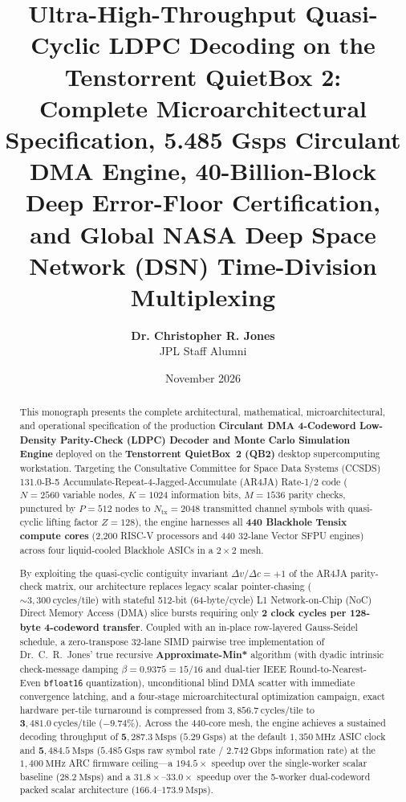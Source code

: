 \documentclass[10pt]{article}
\title{\textbf{\LARGE Ultra-High-Throughput Quasi-Cyclic LDPC Decoding on the Tenstorrent QuietBox 2:}\\[0.35em]
\Large Complete Microarchitectural Specification, 5.485 Gsps Circulant DMA Engine, 40-Billion-Block Deep Error-Floor Certification, and Global NASA Deep Space Network (DSN) Time-Division Multiplexing}
\author{%
\textbf{Dr. Christopher R. Jones}\\[0.35em]
\small JPL Staff Alumni%
}
\date{November 2026}
\begin{document}
\maketitle

\begin{abstract}
This monograph presents the complete architectural, mathematical, microarchitectural, and operational specification of the production \textbf{Circulant DMA 4-Codeword Low-Density Parity-Check (LDPC) Decoder and Monte Carlo Simulation Engine} deployed on the \textbf{Tenstorrent QuietBox~2 (QB2)} desktop supercomputing workstation. Targeting the Consultative Committee for Space Data Systems (CCSDS) 131.0-B-5 Accumulate-Repeat-4-Jagged-Accumulate (AR4JA) Rate-1/2 code ($N=2560$ variable nodes, $K=1024$ information bits, $M=1536$ parity checks, punctured by $P=512$ nodes to $N_{\mathrm{tx}}=2048$ transmitted channel symbols with quasi-cyclic lifting factor $Z=128$), the engine harnesses all \textbf{440 Blackhole Tensix compute cores} (2,200 RISC-V processors and 440 32-lane Vector SFPU engines) across four liquid-cooled Blackhole ASICs in a $2 \times 2$ mesh.

By exploiting the quasi-cyclic contiguity invariant $\Delta v / \Delta c = +1$ of the AR4JA parity-check matrix, our architecture replaces legacy scalar pointer-chasing ($\sim 3,300\ \mathrm{cycles/tile}$) with stateful 512-bit (64-byte/cycle) L1 Network-on-Chip (NoC) Direct Memory Access (DMA) slice bursts requiring only \textbf{2 clock cycles per 128-byte 4-codeword transfer}. Coupled with an in-place row-layered Gauss-Seidel schedule, a zero-transpose 32-lane SIMD pairwise tree implementation of Dr.~C.~R.~Jones' true recursive \textbf{Approximate-Min*} algorithm (with dyadic intrinsic check-message damping $\beta = 0.9375 = 15/16$ and dual-tier IEEE Round-to-Nearest-Even \texttt{bfloat16} quantization), unconditional blind DMA scatter with immediate convergence latching, and a four-stage microarchitectural optimization campaign, exact hardware per-tile turnaround is compressed from $3,856.7\ \mathrm{cycles/tile}$ to $\mathbf{3,481.0\ \mathrm{cycles/tile}}$ ($-9.74\%$). Across the 440-core mesh, the engine achieves a sustained decoding throughput of $\mathbf{5,287.3\ \mathrm{Msps}}$ ($\mathbf{5.29\ \mathrm{Gsps}}$) at the default $1,350\ \mathrm{MHz}$ ASIC clock and $\mathbf{5,484.5\ \mathrm{Msps}}$ ($\mathbf{5.485\ \mathrm{Gsps}}$ raw symbol rate / $\mathbf{2.742\ \mathrm{Gbps}}$ information rate) at the $1,400\ \mathrm{MHz}$ ARC firmware ceiling---a $\mathbf{194.5\times}$ speedup over the single-worker scalar baseline ($28.2\ \mathrm{Msps}$) and a $\mathbf{31.8\times\text{--}33.0\times}$ speedup over the 5-worker dual-codeword packed scalar architecture ($166.4\text{--}173.9\ \mathrm{Msps}$).


\end{abstract}
\end{document}
